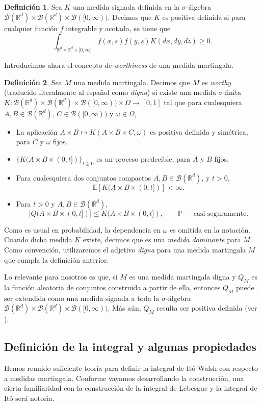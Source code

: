 \documentclass[letterpaper,twoside,12pt]{book}
\newcommand{\R}{\mathbb{R}}
\newcommand{\B}{\mathcal{B}}
\newcommand{\E}{\mathbb{E}}
\renewcommand{\P}{\mathbb{P}}
\newcommand{\1}{\mathds{1}}
\newcommand{\abs}[1]{\left\lvert #1 \right\rvert}
\renewcommand{\to}{\rightarrow}
\theoremstyle{definition}
\newtheorem{dfn}{Definición}
\theoremstyle{definition}
\theoremstyle{remark}
\theoremstyle{definition}
\theoremstyle{definition}
\theoremstyle{definition}
\theoremstyle{definition}
\theoremstyle{definition}
\begin{document}
\begin{dfn} 
 Sea $K$ una medida signada definida en la $\sigma$-álgebra $\B(\R^{d})\times\B(\R^{d})\times\B([0,\infty))$. Decimos que $K$ es positiva definida si para cualquier función $f$ integrable y acotada, se tiene que 
 \[
 \int_{\R^{d}\times\R^{d}\times [0,\infty)} f(x,s)f(y,s)K(dx, dy, dz) \geq 0.
 \]
 \end{dfn}
 Introducimos ahora el concepto de \textit{worthiness} de una medida martingala.
\begin{dfn} 
Sea $M$ una medida martingala. Decimos que $M$ es \textit{worthy} (traducido literalmente al español como \textit{digna}) si existe una medida $\sigma$-finita $K:\B(\R^{d})\times \B(\R^{d})\times \B([0,\infty))\times \Omega \to [0,1]$ tal que para cualesquiera $A,B\in \B(\R^{d})$, $C\in \B([0,\infty))$ y $\omega \in \Omega$, 
\begin{itemize}
   \item La aplicación $A\times B\mapsto K(A\times B \times C,\omega)$ es positiva definida y simétrica, para $C$ y $\omega$ fijos.
   \item $\{K(A\times B \times (0,t])\}_{t\geq0}$ es un proceso predecible, para $A$ y $B$ fijos.
   \item Para cualesquiera dos conjuntos compactos $A,B \in \B(\R^{d})$, y $t>0$, 
   \[
   \E\left[K(A\times B \times (0,t])\right]<\infty.
   \]
   \item Para $t>0$ y $A,B\in \B(\R^{d})$, 
   \[
   \abs{Q(A\times B \times (0,t])}\leq K(A\times B \times (0,t]), \qquad \P-\text{ casi seguramente.}   
   \]
\end{itemize}
\end{dfn}
Como es usual en probabilidad, la dependencia en $\omega$ es omitida en la notación. Cuando dicha medida $K$ existe, decimos que es una \textit{medida dominante} para $M$. Como convención, utilizaremos el adjetivo \textit{digna} para una medida martingala $M$ que cumpla la definición anterior.

Lo relevante para nosotros es que, si $M$ es una medida martingala digna y $Q_M$ es la función aleatoria de conjuntos construida a partir de ella, entonces $Q_M$ puede ser extendida como una medida signada a toda la $\sigma$-álgebra $\B(\R^{d})\times\B(\R^{d})\times\B([0,\infty))$. Más aún, $Q_M$ resulta ser positiva definida (ver \cite[p. 291]{Walsh_J.B_Introduction_to_SPDEs}).  


\subsection{Definición de la integral y algunas propiedades}
Hemos reunido suficiente teoría para definir la integral de Itô-Walsh con respecto a medidas martingala. Conforme vayamos desarrollando la construcción, una cierta familiaridad con la construcción de la integral de Lebesgue y la integral de Itô será notoria. 
\end{document}
